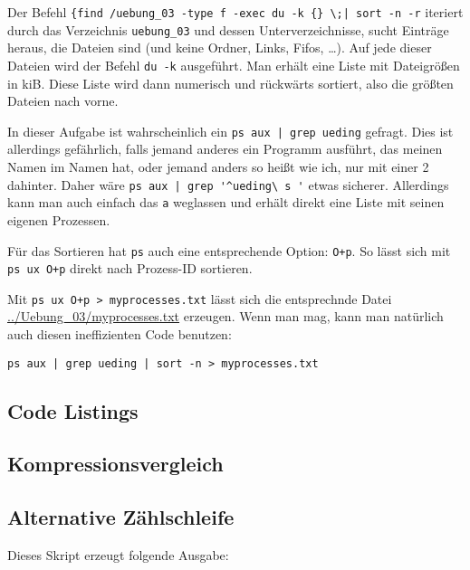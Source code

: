 \documentclass[10pt]{article}
\begin{document}
Der Befehl \verb#{find /uebung_03 -type f -exec du -k {} \;| sort -n -r# iteriert durch das Verzeichnis \verb#uebung_03# und dessen Unterverzeichnisse, sucht Einträge heraus, die Dateien sind (und keine Ordner, Links, Fifos, …). Auf jede dieser Dateien wird der Befehl \texttt{du -k} ausgeführt. Man erhält eine Liste mit Dateigrößen in kiB. Diese Liste wird dann numerisch und rückwärts sortiert, also die größten Dateien nach vorne.


In dieser Aufgabe ist wahrscheinlich ein \verb#ps aux | grep ueding# gefragt. Dies ist allerdings gefährlich, falls jemand anderes ein Programm ausführt, das meinen Namen im Namen hat, oder jemand anders so heißt wie ich, nur mit einer 2 dahinter. Daher wäre \verb#ps aux | grep '^ueding\ s '# etwas sicherer. Allerdings kann man auch einfach das \texttt{a} weglassen und erhält direkt eine Liste mit seinen eigenen Prozessen.

Für das Sortieren hat \texttt{ps} auch eine entsprechende Option: \texttt{O+p}. So lässt sich mit \texttt{ps ux O+p} direkt nach Prozess-ID sortieren.

Mit \verb#ps ux O+p > myprocesses.txt# lässt sich die entsprechnde Datei \url{../Uebung_03/myprocesses.txt} erzeugen. Wenn man mag, kann man natürlich auch diesen ineffizienten Code benutzen:
\begin{lstlisting}
ps aux | grep ueding | sort -n > myprocesses.txt
\end{lstlisting}




\newpage

\begin{appendix}



\section{Code Listings}
\subsection{Kompressionsvergleich}
\label{listing:compression}
\lstset{language=bash}


\subsection{Alternative Zählschleife}
\label{listing:zahlen2}

\lstset{language=bash}


Dieses Skript erzeugt folgende Ausgabe:


\end{appendix}
\end{document}
